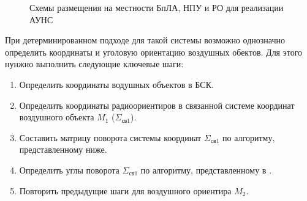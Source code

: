 \documentclass[a4paper,12pt]{article}
\begin{document}
\begin{figure}[htbp]
    \begin{center}


    \caption{Схемы размещения на местности БпЛА, НПУ и РО для реализации АУНС}
    \label{figure:pic3}
    \end{center}
\end{figure}

При детерминированном подходе для такой системы возможно однозначно определить координаты
и уголовую ориентацию воздушных обектов. Для этого нунжно выполнить следующие ключевые шаги:
\begin{enumerate}
    \item Определить координаты водушных объектов в БСК.
    \item Определить координаты радиоориентиров в связанной системе координат воздушного объекта $M_1$ ($\Sigma_{\text{св}1}$).
    \item Составить матрицу поворота системы координат $\Sigma_{\text{св}1}$ по алгоритму, представленному ниже.
    \item Определить углы поворота $\Sigma_{\text{св}1}$ по алгоритму, представленному в \cite{antennas}.
    \item Повторить предыдущие шаги для воздушного ориентира $M_2$.
\end{enumerate}
\end{document}
